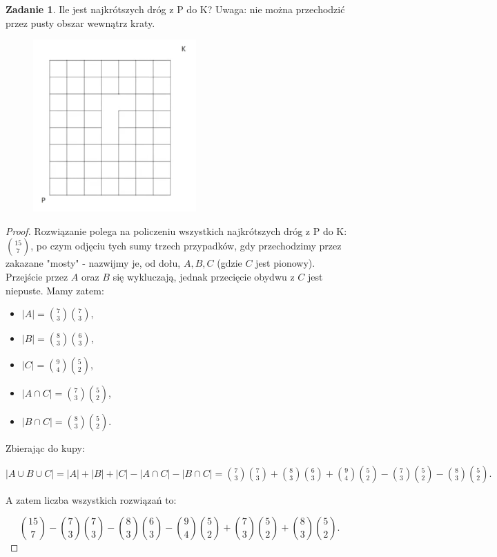 \documentclass[11pt]{article}
\theoremstyle{definition}
\newtheorem{zadanie}{Zadanie}
\numberwithin{zadanie}{subsection}
\begin{document}
\begin{zadanie}
    Ile jest najkrótszych dróg z P do K? Uwaga: nie można przechodzić przez pusty obszar wewnątrz kraty.

    \begin{figure}[H]
        \centering
        \includegraphics[width=0.3\linewidth]{kraty2.png}
    \end{figure}
\end{zadanie}

\begin{proof}
    Rozwiązanie polega na policzeniu wszystkich najkrótszych dróg z P do K:$\binom{15}7$, po czym odjęciu tych sumy trzech przypadków, gdy przechodzimy przez zakazane "mosty" - nazwijmy je, od dołu, $A, B, C$ (gdzie $C$ jest pionowy). Przejście przez $A$ oraz $B$ się wykluczają, jednak przecięcie obydwu z $C$ jest niepuste. Mamy zatem:
    \begin{itemize}
        \item $|A| = \binom73\binom73$,
        \item $|B| = \binom83\binom63$,
        \item $|C| = \binom94\binom52$,
        \item $|A\cap C| = \binom73\binom52$,
        \item $|B\cap C| = \binom83\binom52$.
    \end{itemize}

    Zbierając do kupy:

    $|A\cup B\cup C| = |A| + |B| + |C| - |A\cap C| - |B\cap C|=\binom73\binom73+\binom83\binom63+\binom94\binom52-\binom73\binom52-\binom83\binom52.$

    A zatem liczba wszystkich rozwiązań to:

    $$\binom{15}7 - \binom73\binom73-\binom83\binom63-\binom94\binom52+\binom73\binom52+\binom83\binom52.$$
\end{proof}
\end{document}
